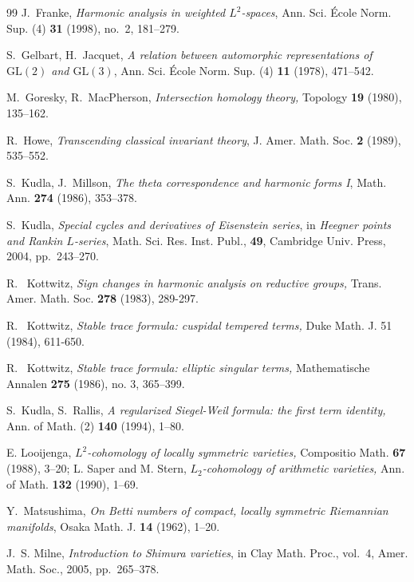 \documentclass[12pt]{amsart}
\theoremstyle{definition}
\begin{document}
\begin{thebibliography}{99}
J.~Franke, \textit{Harmonic analysis in weighted $L^2$-spaces},  {Ann. Sci. École Norm. Sup. (4)} \textbf{31} (1998), no.~2, 181--279.



S.~Gelbart, H.~Jacquet, \textit{A relation between automorphic representations of $\mathrm{GL}(2)$ and $\mathrm{GL}(3)$}, {Ann. Sci. École Norm. Sup. (4)} \textbf{11} (1978), 471--542.

M.~Goresky, R.~MacPherson, \textit{Intersection homology theory,} {Topology} \textbf{19} (1980), 135--162.

R.~Howe, \textit{Transcending classical invariant theory},  {J. Amer. Math. Soc.} \textbf{2} (1989), 535--552.

S.~Kudla, J.~Millson, \textit{The theta correspondence and harmonic forms I}, {Math. Ann.} \textbf{274} (1986), 353--378.

S.~Kudla, \textit{Special cycles and derivatives of Eisenstein series}, in \emph{Heegner points and Rankin $L$-series}, Math. Sci. Res. Inst. Publ., \textbf{49}, Cambridge Univ. Press, 2004, pp.~243--270.


 R. ~Kottwitz, \textit{Sign changes in harmonic analysis on reductive groups,} Trans. Amer. Math.
Soc. \textbf{278} (1983), 289-297. 

R. ~Kottwitz, \textit{Stable trace formula: cuspidal tempered terms,} Duke Math. J. 51 (1984),
611-650.

R. ~Kottwitz, \textit{Stable trace formula: elliptic singular terms,} Mathematische Annalen
\textbf{275} (1986), no. 3, 365–399.



S.~Kudla, S.~Rallis,\textit{ A regularized Siegel-Weil formula: the first term identity,}  {Ann. of Math. (2)} \textbf{140} (1994), 1--80.

 E. Looijenga, \textit{$L^2$-cohomology of locally symmetric varieties,} Compositio Math. \textbf{67} (1988), 3–20; L. Saper and M. Stern, \textit{$L_2$-cohomology of arithmetic varieties,} Ann. of Math. \textbf{132} (1990), 1–69.

Y.~Matsushima, \textit{On Betti numbers of compact, locally symmetric Riemannian manifolds}, {Osaka Math. J.} \textbf{14} (1962), 1--20.

J.~S. Milne, \textit{Introduction to Shimura varieties}, in {Clay Math. Proc.}, vol.~4, Amer. Math. Soc., 2005, pp.~265--378.


\end{thebibliography}
\end{document}
